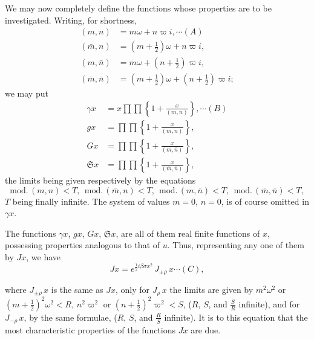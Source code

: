\documentclass[12pt,a4paper]{article}
\newcommand{\fS}{\mathfrak{S}}
\newcommand{\mn}{(m,n)}
\newcommand{\mbn}{(\bar m,n)}
\newcommand{\mnb}{(m,\bar n)}
\newcommand{\mbnb}{(\bar m,\bar n)}
\begin{document}
We may now completely define the functions whose properties are to be investigated. Writing, for shortness,
\begin{align*}
\mn &= m\omega + n\varpi i, \cdots(A)\\
\mbn &= (m + \tfrac{1}{2})\omega + n\varpi i,\\
\mnb &= m\omega + (n + \tfrac{1}{2})\varpi i,\\
\mbnb &= (m + \tfrac{1}{2})\omega + (n + \tfrac{1}{2})\varpi i;
\end{align*}
we may put
\begin{align*}
\gamma x &= x\prod\prod\!\left\{1 + \frac{x}{\mn}\right\}, \cdots(B)\\
g x &= \prod\prod\!\left\{1 + \frac{x}{\mbn}\right\},\\
G x &= \prod\prod\!\left\{1 + \frac{x}{\mnb}\right\},\\
\fS x &= \prod\prod\!\left\{1 + \frac{x}{\mbnb}\right\},
\end{align*}
the limits being given respectively by the equations
\[
\mathrm{mod.}\,\mn < T,\ \ \mathrm{mod.}\,\mbn < T,\ \ \mathrm{mod.}\,\mnb < T,\ \ \mathrm{mod.}\,\mbnb < T,
\]
$T$ being finally infinite. The system of values $m = 0$, $n = 0$, is of course omitted in $\gamma x$.

The functions $\gamma x$, $g x$, $G x$, $\fS x$, are all of them real finite functions of $x$, possessing properties analogous to that of $u$. Thus, representing any one of them by $Jx$, we have
\[
J x = e^{\frac{1}{2}i\beta\sigma x^2}\, J_{\pm\rho}\,x \cdots(C),
\]

\newpage
\setcounter{page}{141}

where $J_{\pm\rho}\,x$ is the same as $J x$, only for $J_\rho\,x$ the limits are given by $m^2\omega^2$ or $(m + \tfrac{1}{2})^2\omega^2 < R$, $n^2\varpi^2$ or $(n + \tfrac{1}{2})^2\varpi^2 < S$, ($R$, $S$, and $\frac{S}{R}$ infinite), and for $J_{-\rho}\,x$, by the same formulae, ($R$, $S$, and $\frac{R}{S}$ infinite). It is to this equation that the most characteristic properties of the functions $J x$ are due.
\end{document}
